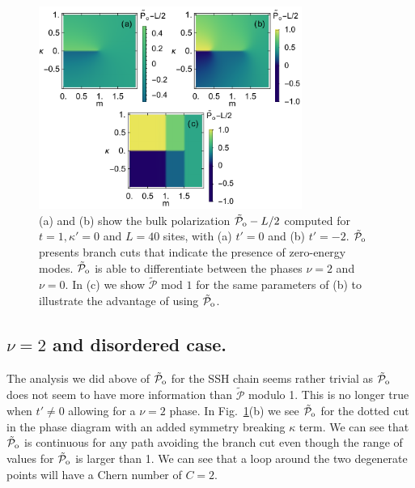 \documentclass[twocolumn,amsmath,longbibliography,amssymb,superscriptaddress]{revtex4-1}
\newcommand{\tpo}{\tilde{\mathcal{P}}_{\rm o}}
\begin{document}
\begin{figure}[t]
\includegraphics[width=86mm]{fig5comp.pdf}
\caption{(a) and (b) show the bulk polarization $\tpo-L/2$ computed for $t=1,\kappa'=0$ and $L=40$ sites, with (a) $t'=0$ and (b) $t'=-2$. $\tpo$ presents branch cuts that indicate the presence of zero-energy modes. $\tpo$ is able to differentiate between the phases $\nu=2$ and $\nu=0$. In (c) we show $\tilde{\mathcal{P}}$ mod $1$ for the same parameters of (b) to illustrate the advantage of using $\tpo$. }
	\label{ssh_chern}
\end{figure}




\subsection{$\nu = 2$ and disordered case. }

The analysis we did above of $\tpo$ for the SSH chain seems rather trivial as $\tpo$ does not seem to have more information than $\tilde{\mathcal{P}}$ modulo 1. This is no longer true when $t' \neq 0$ allowing for a $\nu = 2$ phase. In Fig.~\ref{ssh_chern}(b) we see $\tpo$ for the dotted cut in the phase diagram with an added symmetry breaking $\kappa$ term. We can see that $\tpo$ is continuous for any path avoiding the branch cut even though the range of values for $\tpo$ is larger than 1. We can see that a loop around the two degenerate points will have a Chern number of $C=2$. 
\end{document}
